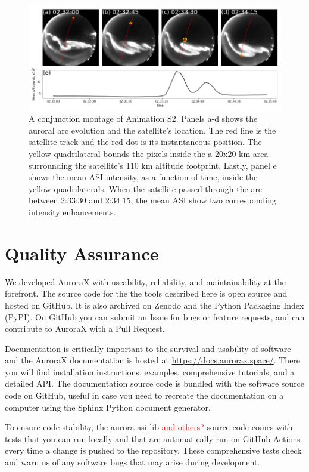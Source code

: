 \documentclass[utf8]{FrontiersinHarvard} %
\begin{document}
\begin{figure}
      \includegraphics[width=\textwidth]{figures/fig4.png}
      \caption{A conjunction montage of Animation S2. Panels a-d shows the auroral arc evolution and the satellite's location. The red line is the satellite track and the red dot is its instantaneous position. The yellow quadrilateral bounds the pixels inside the a 20x20 km area surrounding the satellite's 110 km altitude footprint. Lastly, panel e shows the mean ASI intensity, as a function of time, inside the yellow quadrilaterals. When the satellite passed through the arc between 2:33:30 and 2:34:15, the mean ASI show two corresponding intensity enhancements.}
      \label{fig4}
\end{figure}

\section{Quality Assurance}
We developed AuroraX with useability, reliability, and maintainability at the forefront. The source code for the the tools described here is open source and hosted on GitHub. It is also archived on Zenodo and the Python Packaging Index (PyPI). On GitHub you can submit an Issue for bugs or feature requests, and can contribute to AuroraX with a Pull Request.  

Documentation is critically important to the survival and usability of software and the AuroraX documentation is hosted at \url{https://docs.aurorax.space/}. There you will find installation instructions, examples, comprehensive tutorials, and a detailed API. The documentation source code is bundled with the software source code on GitHub, useful in case you need to recreate the documentation on a computer using the Sphinx Python document generator.

To ensure code stability, the aurora-asi-lib \textcolor{red}{and others?} source code comes with tests that you can run locally and that are automatically run on GitHub Actions every time a change is pushed to the repository. These comprehensive tests check and warn us of any software bugs that may arise during development.
\end{document}
